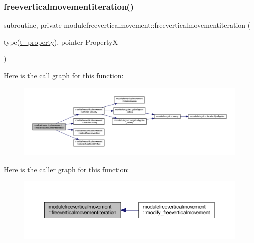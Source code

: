 \subsubsection{\texorpdfstring{freeverticalmovementiteration()}{freeverticalmovementiteration()}}
{\footnotesize\ttfamily subroutine, private modulefreeverticalmovement\+::freeverticalmovementiteration (\begin{DoxyParamCaption}\item[{type(\mbox{\hyperlink{structmodulefreeverticalmovement_1_1t__property}{t\+\_\+property}}), pointer}]{PropertyX }\end{DoxyParamCaption})\hspace{0.3cm}{\ttfamily [private]}}

Here is the call graph for this function\+:\nopagebreak
\begin{figure}[H]
\begin{center}
\leavevmode
\includegraphics[width=350pt]{namespacemodulefreeverticalmovement_ac736b639239aa370175df19fc8836c97_cgraph}
\end{center}
\end{figure}
Here is the caller graph for this function\+:\nopagebreak
\begin{figure}[H]
\begin{center}
\leavevmode
\includegraphics[width=350pt]{namespacemodulefreeverticalmovement_ac736b639239aa370175df19fc8836c97_icgraph}
\end{center}
\end{figure}
\mbox{\label{namespacemodulefreeverticalmovement_abe59234b027e4daf4dad54daa42f5438}} 

